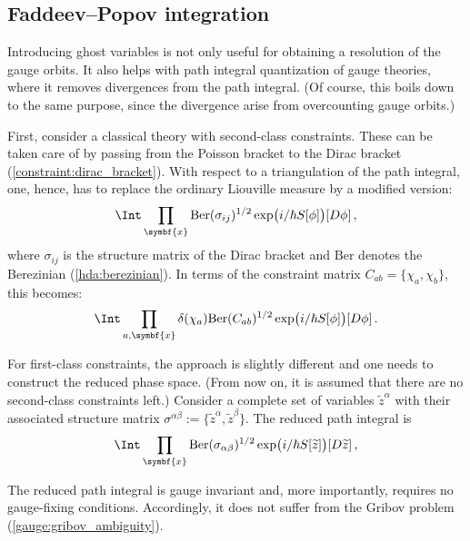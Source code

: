 \subsection{Faddeev--Popov integration}

    Introducing ghost variables is not only useful for obtaining a resolution of the gauge orbits. It also helps with path integral quantization of gauge theories, where it removes divergences from the path integral. (Of course, this boils down to the same purpose, since the divergence arise from overcounting gauge orbits.)

    First, consider a classical theory with second-class constraints. These can be taken care of by passing from the Poisson bracket to the Dirac bracket (\cref{constraint:dirac_bracket}). With respect to a triangulation of the path integral, one, hence, has to replace the ordinary Liouville measure by a modified version:
    \begin{gather}
        \Int\prod_{\symbf{x}}\mathrm{Ber}(\sigma_{ij})^{1/2}\exp\bigl(i/\hbar S[\phi]\bigr)[D\phi]\,,
    \end{gather}
    where $\sigma_{ij}$ is the structure matrix of the Dirac bracket and $\mathrm{Ber}$ denotes the Berezinian (\cref{hda:berezinian}). In terms of the constraint matrix $C_{ab}=\{\chi_a,\chi_b\}$, this becomes:
    \begin{gather}
        \Int\prod_{a,\symbf{x}}\delta(\chi_a)\mathrm{Ber}(C_{ab})^{1/2}\exp\bigl(i/\hbar S[\phi]\bigr)[D\phi]\,.
    \end{gather}

    For first-class constraints, the approach is slightly different and one needs to construct the reduced phase space. (From now on, it is assumed that there are no second-class constraints left.) Consider a complete set of variables $\widetilde{z}^\alpha$ with their associated structure matrix $\sigma^{\alpha\beta}:=\{\widetilde{z}^\alpha,\widetilde{z}^\beta\}$. The reduced path integral is
    \begin{gather}
        \Int\prod_{\symbf{x}}\mathrm{Ber}(\sigma_{\alpha\beta})^{1/2}\exp\bigl(i/\hbar S[\widetilde{z}]\bigr)[D\widetilde{z}]\,,
    \end{gather}

    \begin{remark}
        The reduced path integral is gauge invariant and, more importantly, requires no gauge-fixing conditions. Accordingly, it does not suffer from the Gribov problem (\cref{gauge:gribov_ambiguity}).
    \end{remark}

